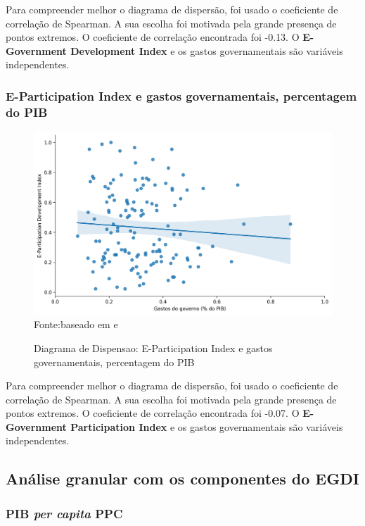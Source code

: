 Para compreender melhor o diagrama de dispersão, foi usado o coeficiente de correlação de Spearman. A sua escolha foi motivada pela grande presença de pontos extremos. O coeficiente de correlação encontrada foi -0.13. O \textbf{E-Government Development Index} e os gastos governamentais são variáveis independentes.

\subsubsection{E-Participation Index e gastos governamentais, percentagem do PIB}

\begin{figure}[H]
	\centering
	\caption{Diagrama de Dispensao: E-Participation Index e gastos governamentais, percentagem do PIB}
	\includegraphics[width=1\linewidth]{figuras/egdi/dispersao_epart_govexpenditure}
	\label{fig:dispersao_epart_govexpenditure}
	\footnotesize{Fonte:baseado em \cite{ONU_EGDI_mapa} e \cite{FMI_gov_expenditure}}
\end{figure}

Para compreender melhor o diagrama de dispersão, foi usado o coeficiente de correlação de Spearman. A sua escolha foi motivada pela grande presença de pontos extremos. O coeficiente de correlação encontrada foi -0.07. O \textbf{E-Government Participation Index} e os gastos governamentais são variáveis independentes.

\subsection{Análise granular com os componentes do EGDI}

\subsubsection{PIB \textit{per capita} PPC}

